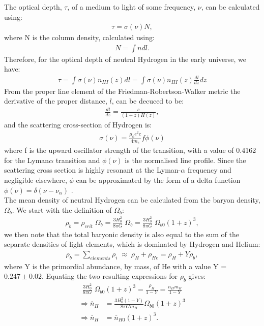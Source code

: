 \documentclass[pdf,color]{UoBnote}
\begin{document}
The optical depth, $\tau$, of a medium to light of some frequency, $\nu$, can be calculated using:
\begin{align}
			\tau = \sigma(\nu) N ,
\end{align}
where N is the column density, calculated using:
\begin{align}
			N = \int n dl .
\end{align}
Therefore, for the optical depth of neutral Hydrogen in the early universe, we have:
\begin{align}
			\tau = \int{} \sigma ( \nu ) n_{HI}(z) dl    
			        = \int{} \sigma ( \nu ) n_{HI}(z) \frac{dl}{dz} dz
\end{align}
From the proper line element of the Friedman-Robertson-Walker metric the derivative of the proper distance, $l$, can be decuced to be:
\begin{align}
			\frac{dl}{dz} = \frac{c}{(1+z) H(z)} ,
\end{align}
and the scattering cross-section of Hydrogen is:
\begin{align}
			\sigma (\nu) = \frac{\mu_0 e^2 c}{4 m_e} f \phi(\nu)
\end{align}
where f is the upward oscillator strength of the transition, with a value of 0.4162 for the Lyman$\alpha$ transition and $\phi(\nu)$ is the normalised line profile. Since the scattering cross section is highly resonant at the Lyman-$\alpha$ frequency and negligible elsewhere, $\phi$ can be approximated by the form of a delta function $\phi(\nu) = \delta (\nu - \nu_\alpha)$ . \\

The mean density of neutral Hydrogen can be calculated from the baryon density, $\Omega_b$. We start with the definition of $\Omega_b$:
\begin{align}
			\rho_b = \rho_{crit} \; \Omega_b =  \frac{3H_0^2}{ 8 \pi G} \; \Omega_b = \frac{3H_0^2}{ 8 \pi G} \; \Omega_{b0}(1+z)^3,
\end{align}
we then note that the total baryonic density is also equal to the sum of the separate densities of light elements, which is dominated by Hydrogen and Helium:
\begin{align}
			\rho_b = \sum_{elements} \rho_i \; \approx \; \rho_H + \rho_{He} = \rho_H + Y\rho_b,
\end{align}
where Y is the primordial abundance, by mass, of He with a value Y = $0.247 \pm 0.02$. Equating the two resulting expressions for $\rho_b$ gives:
\begin{align}
			 \frac{3H_0^2}{ 8 \pi G} \; \Omega_{b0}(1+z)^3 = \frac{\rho_H}{1-Y} = \frac{n_H m_H}{1-Y}
\end{align}
\begin{align}
			 \Rightarrow \overline{n}_H &= \frac{3  H_0^2 (1-Y)}{ 8 \pi G m_H} \Omega_{b0} (1+z)^3 \\
			 \Rightarrow \overline{n}_H &= \overline{n}_{H0} (1+z)^3 . 
\end{align} 
\end{document}
